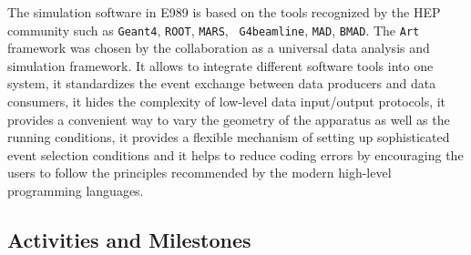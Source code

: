 \documentclass[pdftex,12pt,letter]{article}
\begin{document}
The simulation software in E989 is based on the tools recognized by
the HEP community such as {\tt Geant4}, {\tt ROOT}, {\tt MARS}, {\tt
  G4beamline}, {\tt MAD}, {\tt BMAD}. 
The {\tt Art} framework was chosen by the collaboration as a universal
data analysis and simulation framework.
It allows to integrate different software tools into one system, it
standardizes the event exchange between data producers and data
consumers, it hides the complexity of low-level data input/output
protocols, it provides a convenient way to vary the geometry of the
apparatus as well as the running conditions, it provides a flexible
mechanism of setting up sophisticated event selection conditions and
it helps to reduce coding errors by encouraging the users to follow
the principles recommended by the modern high-level programming
languages.

\subsection{Activities and Milestones}
\end{document}
